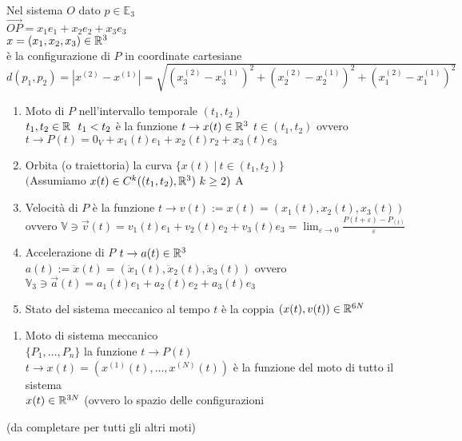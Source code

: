 \documentclass[12px]{article}
\begin{document}
	Nel sistema $O$ dato $p\in\mathbb E_3$ \\
	$ \overrightarrow{OP} = x_1e_1 + x_2e_2 + x_3e_3$\\
	$x = (x_1,x_2,x_3)\in\mathbb{R}^3$\\
	è la configurazione di $P$ in coordinate cartesiane\\
	$d(p_1,p_2) = |x^{(2)} - x^{(1)}| = \sqrt{(x_3^{(2)} - x_3^{(1)})^2 + (x_2^{(2)} - x_2^{(1)})^2 + (x_1^{(2)} - x_1^{(1)})^2}$ 
	\newpage
	\begin{defi}[Moto] \text{} 
\begin{enumerate}
	\item Moto di $P$ nell'intervallo temporale $(t_1,t_2)$\\
		$t_1,t_2\in\mathbb{R}\ \ t_1 < t_2$ è la funzione $t \rightarrow x(t)\in\mathbb{R}^3$ $t\in(t_1,t_2)$ ovvero $t \rightarrow P(t) = 0_V + x_1(t)e_1 + x_2(t)r_2 + x_3(t)e_3$ 
	\item Orbita (o traiettoria) la curva $\{x(t)\  |\  t\in (t_1,t_2)\}$ \\
		$($Assumiamo $x(t)\in C^k ( (t_1,t_2),\mathbb{R}^3) \ k\geq 2)$ A
	\item Velocità di $P$ è la funzione $t \rightarrow v(t) := x(t) = (x_1(t),x_2(t),x_3(t))$ \\
	ovvero $ \mathbb V\ni \overrightarrow{v}(t)= v_1(t)e_1 + v_2(t) e_2 + v_3(t)e_3 = \lim_{\varepsilon \rightarrow 0 }\frac{P(t + \varepsilon)-P_(t)}{\varepsilon}$ 
\item Accelerazione di $P$  $t \rightarrow a(t)\in \mathbb{R}^3$\\
	$a(t) := \ddot x(t) = (\ddot x_1(t), \ddot x_2(t), \ddot x_3(t)) $ ovvero\\
$\mathbb V_3\ni \overrightarrow{a}(t) = a_1(t)e_1 + a_2(t)e_2 + a_3(t)e_3$ 
\item Stato del sistema meccanico al tempo $t$ è la coppia $(x(t), v(t))\in\mathbb{R}^{6N}$
\end{enumerate} 
	\end{defi}
	\begin{defi}
		\text{}
		\begin{enumerate}
			\item Moto di sistema meccanico\\
				$\{P_1,\ldots,P_n\}$ la funzione $t \rightarrow P(t)$ \ \ $t \rightarrow x(t) = (x^{(1)}(t), \ldots, x^{(N)}(t))$ è la funzione del moto di tutto il sistema\\
				$x(t)\in \mathbb{R}^{3N}$ (ovvero lo spazio delle configurazioni 
		\end{enumerate}
		(da completare per tutti gli altri moti)
	\end{defi}
\end{document}
